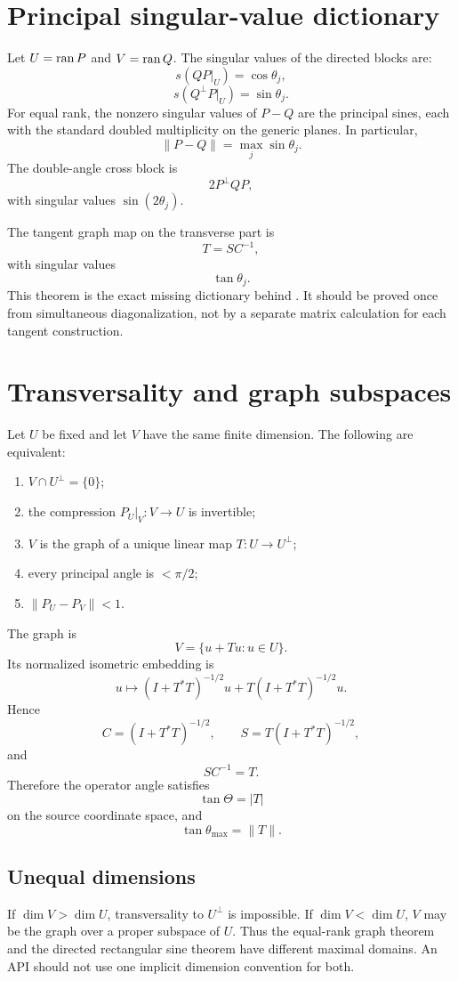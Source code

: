 \section{Principal singular-value dictionary}

Let $U=\operatorname{ran} P$ and $V=\operatorname{ran} Q$. The singular values of the directed blocks are:
\[
  s(QP|_U)=\cos\theta_j,
\]
\[
  s(Q^\perp P|_U)=\sin\theta_j.
\]
For equal rank, the nonzero singular values of $P-Q$ are the principal sines, each with the standard doubled multiplicity on the generic planes. In particular,
\[
  \|P-Q\|=\max_j\sin\theta_j.
\]
The double-angle cross block is
\[
  2P^\perp QP,
\]
with singular values $\sin(2\theta_j)$.

The tangent graph map on the transverse part is
\[
  T=SC^{-1},
\]
with singular values
\[
  \tan\theta_j.
\]
This theorem is the exact missing dictionary behind . It should be proved once from simultaneous diagonalization, not by a separate matrix calculation for each tangent construction.

\section{Transversality and graph subspaces}

Let $U$ be fixed and let $V$ have the same finite dimension. The following are equivalent:
\begin{enumerate}
\item $V\cap U^\perp=\{0\}$;
\item the compression $P_U|_V:V\to U$ is invertible;
\item $V$ is the graph of a unique linear map $T:U\to U^\perp$;
\item every principal angle is $<\pi/2$;
\item $\|P_U-P_V\|<1$.
\end{enumerate}
The graph is
\[
  V=\{u+Tu:u\in U\}.
\]
Its normalized isometric embedding is
\[
  u\longmapsto (I+T^*T)^{-1/2}u
    +T(I+T^*T)^{-1/2}u.
\]
Hence
\[
  C=(I+T^*T)^{-1/2},
  \qquad
  S=T(I+T^*T)^{-1/2},
\]
and
\[
  SC^{-1}=T.
\]
Therefore the operator angle satisfies
\[
  \tan\Theta=|T|
\]
on the source coordinate space, and
\[
  \tan\theta_{\max}=\|T\|.
\]

\subsection{Unequal dimensions}

If $\dim V>\dim U$, transversality to $U^\perp$ is impossible. If $\dim V<\dim U$, $V$ may be the graph over a proper subspace of $U$. Thus the equal-rank graph theorem and the directed rectangular sine theorem have different maximal domains. An API should not use one implicit dimension convention for both.

